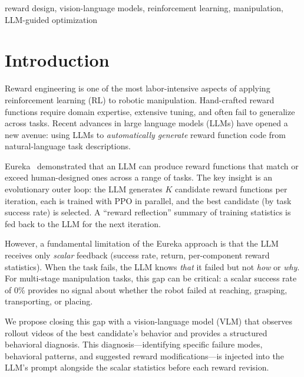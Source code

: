 \documentclass[conference]{IEEEtran}
\begin{document}
\begin{IEEEkeywords}
reward design, vision-language models, reinforcement learning, manipulation,
LLM-guided optimization
\end{IEEEkeywords}

\section{Introduction}

Reward engineering is one of the most labor-intensive aspects of applying
reinforcement learning (RL) to robotic manipulation. Hand-crafted reward
functions require domain expertise, extensive tuning, and often fail to
generalize across tasks. Recent advances in large language models (LLMs) have
opened a new avenue: using LLMs to \emph{automatically generate} reward
function code from natural-language task descriptions.

Eureka~\cite{ma2024eureka} demonstrated that an LLM can produce reward functions that
match or exceed human-designed ones across a range of tasks. The key insight is
an evolutionary outer loop: the LLM generates $K$ candidate reward functions per
iteration, each is trained with PPO in parallel, and the best candidate (by task
success rate) is selected. A ``reward reflection'' summary of training
statistics is fed back to the LLM for the next iteration.

However, a fundamental limitation of the Eureka approach is that the LLM
receives only \emph{scalar} feedback (success rate, return, per-component reward
statistics). When the task fails, the LLM knows \emph{that} it failed but not
\emph{how} or \emph{why}. For multi-stage manipulation tasks, this gap can be
critical: a scalar success rate of 0\% provides no signal about whether the
robot failed at reaching, grasping, transporting, or placing.

We propose closing this gap with a vision-language model (VLM) that observes
rollout videos of the best candidate's behavior and provides a structured
behavioral diagnosis. This diagnosis---identifying specific failure modes,
behavioral patterns, and suggested reward modifications---is injected into the
LLM's prompt alongside the scalar statistics before each reward revision.
\end{document}
